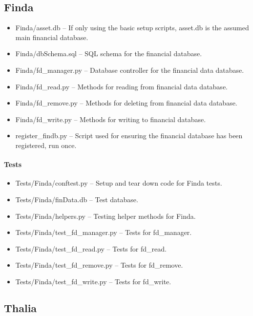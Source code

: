 \documentclass[main.tex]{subfiles}
\begin{document}
\subsection{Finda}\label{finda}

\begin{itemize}

\item
  Finda/asset.db -- If only using the basic setup scripts, asset.db is the assumed main financial database.
\item
  Finda/dbSchema.sql -- SQL schema for the financial database.
\item
  Finda/fd\_manager.py -- Database controller for the financial data database.
\item
  Finda/fd\_read.py -- Methods for reading from financial data database.
\item
  Finda/fd\_remove.py -- Methods for deleting from financial data
  database.
\item
  Finda/fd\_write.py -- Methods for writing to financial database.
\item
  register\_findb.py -- Script used for ensuring the financial database has been registered, run once.
\end{itemize}

\paragraph{Tests}\label{tests-2}

\begin{itemize}

\item
  Tests/Finda/conftest.py -- Setup and tear down code for Finda tests.
\item
  Tests/Finda/finData.db -- Test database.
\item
  Tests/Finda/helpers.py -- Testing helper methods for Finda.
\item
  Tests/Finda/test\_fd\_manager.py -- Tests for fd\_manager.
\item
  Tests/Finda/test\_fd\_read.py -- Tests for fd\_read.
\item
  Tests/Finda/test\_fd\_remove.py -- Tests for fd\_remove.
\item
  Tests/Finda/test\_fd\_write.py -- Tests for fd\_write.
\end{itemize}

\subsection{Thalia}\label{thalia}
\end{document}
